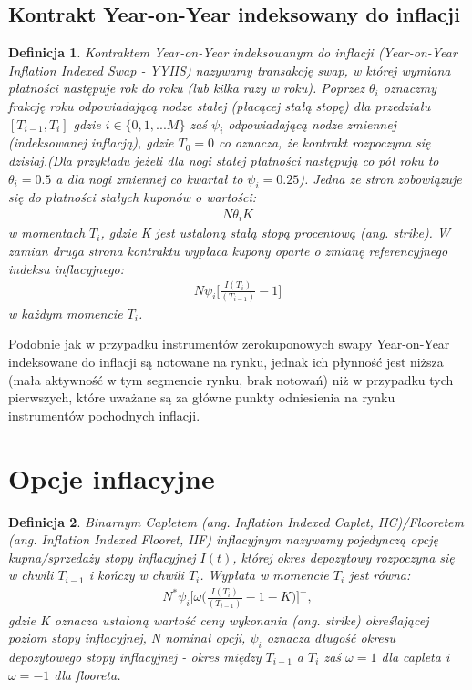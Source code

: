 \documentclass{mini}
\theoremstyle{mythstyle}
\newtheorem{Definicja}{Definicja}[chapter]
\begin{document}
	\subsection{Kontrakt Year-on-Year indeksowany do inflacji }
		
	\begin{Definicja}
	Kontraktem Year-on-Year indeksowanym do inflacji (Year-on-Year Inflation Indexed Swap - YYIIS) nazywamy transakcję swap, w której wymiana płatności następuje rok do roku (lub kilka razy w roku). Poprzez $\theta_i$ oznaczmy frakcję roku odpowiadającą nodze stałej (płacącej stałą stopę) dla przedziału $[T_{i-1},T_i]$ gdzie $i \in \{0, 1, ... M\}$ zaś $\psi_i$  odpowiadającą nodze zmiennej (indeksowanej inflacją), gdzie $T_0 = 0$ co oznacza, że kontrakt rozpoczyna się dzisiaj.(Dla przykładu jeżeli dla nogi stałej płatności następują co pół roku to $\theta_i = 0.5$ a dla nogi zmiennej co kwartał to $\psi_i = 0.25$). Jedna ze stron zobowiązuje się do płatności stałych kuponów o wartości:
	\begin{eqnarray*}
		N\theta_i K
	\end{eqnarray*}
	w momentach  $T_i$, gdzie K jest ustaloną stałą stopą procentową (ang. strike). W zamian druga strona kontraktu wypłaca kupony oparte o zmianę referencyjnego indeksu inflacyjnego:
	\begin{eqnarray*}
		N\psi_i\bigg[\frac{I(T_i)}{(T_{i-1})} - 1\bigg]
	\end{eqnarray*}
	w każdym momencie $T_i$. 
\end{Definicja}
	
	Podobnie jak w przypadku instrumentów zerokuponowych swapy Year-on-Year indeksowane do inflacji są notowane na rynku, jednak ich płynność jest niższa (mała aktywność w tym segmencie rynku, brak notowań) niż w przypadku tych pierwszych, które uważane są za główne punkty odniesienia na rynku instrumentów pochodnych inflacji.
		
	\section{Opcje inflacyjne}
		
	\begin{Definicja}
			Binarnym Capletem (ang. Inflation Indexed Caplet, IIC)/Flooretem (ang. Inflation Indexed Flooret, IIF) inflacyjnym nazywamy pojedynczą opcję kupna/sprzedaży stopy inflacyjnej $I(t)$, której okres depozytowy rozpoczyna się w chwili $T_{i-1}$ i kończy w chwili $T_i$.  
			Wypłata w momencie $T_i$ jest równa:
			\begin{eqnarray*}
				N^{*}\psi_i\bigg[\omega\bigg(\frac{I(T_i)}{(T_{i-1})} - 1 - K \bigg)\bigg]^{+},
			\end{eqnarray*}
			gdzie K oznacza ustaloną wartość ceny wykonania (ang. strike) określającej poziom stopy inflacyjnej, N nominał opcji, $\psi_i$ oznacza długość okresu depozytowego stopy inflacyjnej - okres między  $T_{i-1}$ a  $T_i$ zaś $\omega = 1$ dla capleta i  $\omega = -1$ dla flooreta.
	\end{Definicja}
	
\end{document}
